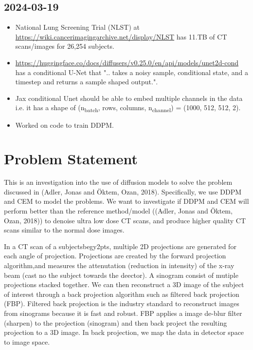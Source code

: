 \documentclass[a4paper, 11pt]{article}
\begin{document}
\subsection{2024-03-19}
\label{sec:org82a066d}
\begin{itemize}
\item National Lung Screening Trial (NLST) at \url{https://wiki.cancerimagingarchive.net/display/NLST} has 11.TB of CT scans/images for 26,254 subjects.
\item \url{https://huggingface.co/docs/diffusers/v0.25.0/en/api/models/unet2d-cond} has a conditional U-Net that ".. takes a noisy sample, conditional state, and a timestep and returns a sample shaped output.".
\item Jax conditional Unet should be able to embed multiple channels in the data i.e. it has a shape of (n\textsubscript{batch}, rows, columns, n\textsubscript{channel}) = (1000, 512, 512, 2).
\item Worked on code to train DDPM.
\end{itemize}

\section{Problem Statement}
\label{sec:org66c7094}
This is an investigation into the use of diffusion models to solve the problem discussed in (Adler, Jonas and Öktem, Ozan, 2018). Specifically, we use DDPM and CEM to model the problems. We want to investigate if DDPM and CEM will perform better than the reference method/model ((Adler, Jonas and Öktem, Ozan, 2018)) to denoise ultra low dose CT scans, and produce higher quality CT scans similar to the normal dose images.

In a CT scan of a subjectsbegy2pts, multiple 2D projections are generated for each angle of projection. Projections are created by the forward projection algorithm,and measures the attenutation (reduction in intensity) of the x-ray beam (cast no the subject towards the deector). A sinogram consist of mutiple projections stacked together. We can then reconstruct a 3D image of the subject of interest through a back projection algorithm such as filtered back projection (FBP). Filtered back projection is the industry standard to reconstruct images from sinograms because it is fast and robust. FBP applies a image de-blur filter (sharpen) to the projection (sinogram) and then back project the resulting projection to a 3D image. In back projection, we map the data in detector space to image space.
\end{document}
